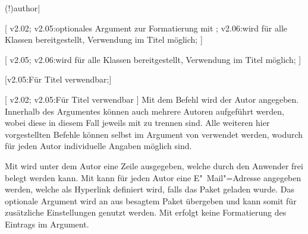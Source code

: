\begin{DeclareEntity*}{}
\begin{DeclareEntity*}{}
\begin{DeclareEntity*}{}
\begin{Declaration}
  {\Macro(!){author|}}
\begin{Declaration}
  {}
\begin{Declaration}
  {}
  [
    v2.02;
    v2.05:optionales Argument zur Formatierung mit ;
    v2.06:wird für alle Klassen bereitgestellt, Verwendung im Titel möglich;
  ]
\begin{Declaration}
  {}
  [
    v2.05;
    v2.06:wird für alle Klassen bereitgestellt, Verwendung im Titel möglich;
  ]
\begin{Declaration}
  {}
\begin{Declaration}
  {}
\begin{Declaration}
  {}
\begin{Declaration}
  {}
\begin{Declaration}
  {}
  [v2.05:Für Titel verwendbar;]
\begin{Declaration}
  {}
  [
    v2.02;
    v2.05:Für Titel verwendbar
  ]
Mit dem Befehl  wird der Autor angegeben. Innerhalb des 
Argumentes können auch mehrere Autoren aufgeführt werden, wobei diese in diesem 
Fall jeweils mit  zu trennen sind. Alle weiteren hier vorgestellten 
Befehle können selbst im Argument von  verwendet werden, wodurch 
für jeden Autor individuelle Angaben möglich sind.

Mit  wird unter dem Autor eine Zeile ausgegeben, welche 
durch den Anwender frei belegt werden kann. Mit  kann für 
jeden Autor eine E"~Mail"=Adresse angegeben werden, welche als Hyperlink
definiert wird, falls das Paket  geladen wurde. Das optionale 
Argument wird an  aus besagtem Paket übergeben und kann somit 
für zusätzliche Einstellungen genutzt werden. Mit  erfolgt 
keine Formatierung des Eintrags im Argument.


\end{Declaration}
\end{Declaration}
\end{Declaration}
\end{Declaration}
\end{Declaration}
\end{Declaration}
\end{Declaration}
\end{Declaration}
\end{Declaration}
\end{Declaration}
\end{DeclareEntity*}
\end{DeclareEntity*}
\end{DeclareEntity*}
